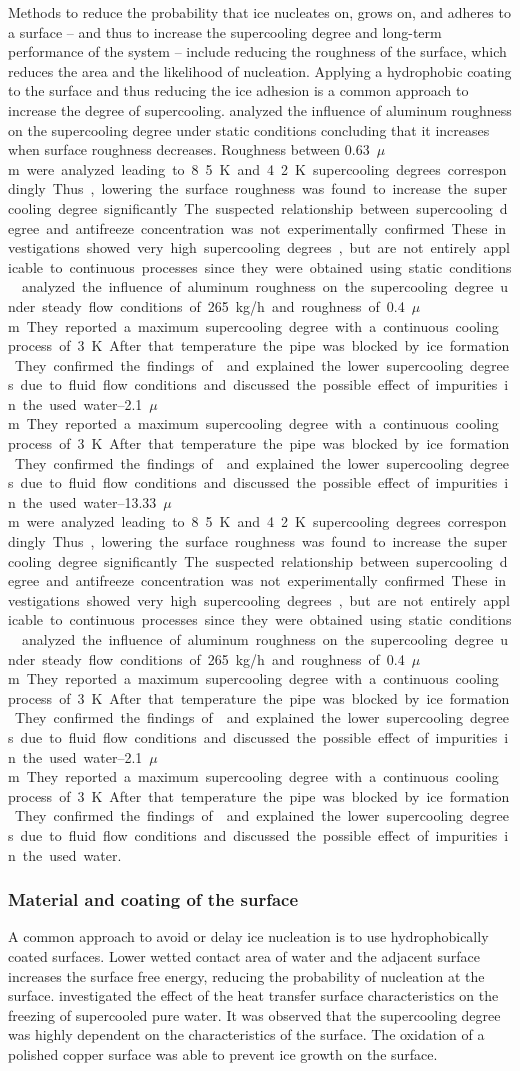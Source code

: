 Methods to reduce the probability that ice nucleates on, grows on, and adheres to a surface -- and thus to increase the supercooling degree and long-term performance of the system -- include reducing the roughness of the surface, which reduces the area and the likelihood of nucleation. Applying a hydrophobic coating to the surface and thus reducing the ice adhesion is a common approach to increase the degree of supercooling.
\cite{faucheux_influence_2006} analyzed the influence of aluminum roughness on the supercooling degree under static conditions concluding that it increases when surface roughness decreases.
Roughness between \SIrange{0.63}{13.33}{$\mu$m} were analyzed leading to 8.5~K and 4.2~K supercooling degrees correspondingly. Thus, lowering the surface roughness was found to increase the supercooling degree significantly. The suspected relationship between supercooling degree and antifreeze concentration was not experimentally confirmed.
These investigations showed very high supercooling degrees, but are not entirely applicable to continuous processes since they were obtained using static conditions.
\cite{ernst_influence_2016} analyzed the influence of aluminum roughness on the supercooling degree under steady flow conditions of \SI{265}{kg/h} and roughness of \SIrange{0.4}{2.1}{$\mu$m}. They reported a maximum supercooling degree with a continuous cooling process of \SI{3}{K}.  After that temperature the pipe was blocked by ice formation. They confirmed the findings of \cite{faucheux_influence_2006} and explained the lower supercooling degrees due to fluid flow conditions and discussed the possible effect of impurities in the used water.


\subsubsection{Material and coating of the surface}

A common approach to avoid or delay ice nucleation is to use hydrophobically coated surfaces. Lower wetted contact area of water and the adjacent surface increases the surface free energy, reducing the probability of nucleation at the surface. 
\cite{saito_fundamental_1994} investigated the effect of the heat transfer surface characteristics on the freezing of supercooled pure water. It was observed that the supercooling degree was highly dependent on the characteristics of the surface. The oxidation of a polished copper surface was able to prevent ice growth on the surface.

